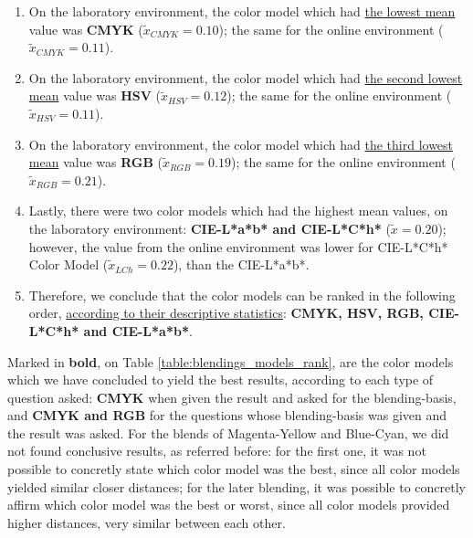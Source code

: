 \begin{enumerate}
  \item On the laboratory environment, the color model which had \ul{the lowest mean} value was \textbf{CMYK} ($\tilde{x}_{CMYK} = 0.10$); the same for the online environment ($\tilde{x}_{CMYK} = 0.11$).
  \item On the laboratory environment, the color model which had \ul{the second lowest mean} value was \textbf{HSV} ($\tilde{x}_{HSV} = 0.12$); the same for the online environment ($\tilde{x}_{HSV} = 0.11$).
  \item On the laboratory environment, the color model which had \ul{the third lowest mean} value was \textbf{RGB} ($\tilde{x}_{RGB} = 0.19$); the same for the online environment ($\tilde{x}_{RGB} = 0.21$).
  \item Lastly, there were two color models which had the highest mean values, on the laboratory environment: \textbf{CIE-L*a*b* and CIE-L*C*h*} ($\tilde{x} = 0.20$); however, the value from the online environment
  was lower for CIE-L*C*h* Color Model ($\tilde{x}_{LCh} = 0.22$), than the CIE-L*a*b*.
  \item Therefore, we conclude that the color models can be ranked in the following order, \ul{according to their descriptive statistics}: \textbf{CMYK, HSV, RGB, CIE-L*C*h* and CIE-L*a*b*}.
\end{enumerate}
%
Marked in \textbf{bold}, on Table \ref{table:blendings_models_rank}, are the color models which we have concluded to yield the best results, according to each type of question asked: \textbf{CMYK} when given the
result and asked for the blending-basis, and \textbf{CMYK and RGB} for the questions whose blending-basis was given and the result was asked. For the blends of Magenta-Yellow and Blue-Cyan, we did not found
conclusive results, as referred before: for the first one, it was not possible to concretly state which color model was the best, since all color models yielded similar closer distances; for the later blending, it was possible
to concretly affirm which color model was the best or worst, since all color models provided higher distances, very similar between each other.
%
